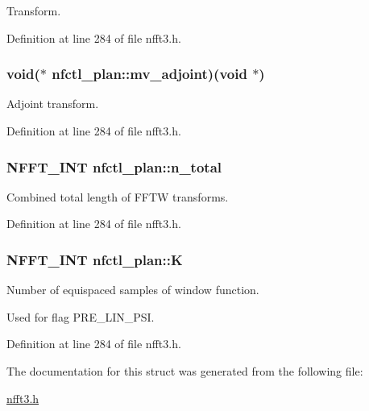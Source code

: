 Transform. 



Definition at line 284 of file nfft3.\-h.

\hypertarget{structnfctl__plan_a99191484b327c3283f3aed8c3e9a3d70}{
\subsubsection[{mv\-\_\-adjoint}]{\setlength{\rightskip}{0pt plus 5cm}void($\ast$ nfctl\-\_\-plan\-::mv\-\_\-adjoint)(void $\ast$)}}\label{structnfctl__plan_a99191484b327c3283f3aed8c3e9a3d70}


Adjoint transform. 



Definition at line 284 of file nfft3.\-h.

\hypertarget{structnfctl__plan_a7c2552cb7e53bc6dddf9fe9c8b8b529a}{
\subsubsection[{n\-\_\-total}]{\setlength{\rightskip}{0pt plus 5cm}N\-F\-F\-T\-\_\-\-I\-N\-T nfctl\-\_\-plan\-::n\-\_\-total}}\label{structnfctl__plan_a7c2552cb7e53bc6dddf9fe9c8b8b529a}


Combined total length of F\-F\-T\-W transforms. 



Definition at line 284 of file nfft3.\-h.

\hypertarget{structnfctl__plan_a0a11ee75ee2bc2f21adf403d0fca7f80}{
\subsubsection[{K}]{\setlength{\rightskip}{0pt plus 5cm}N\-F\-F\-T\-\_\-\-I\-N\-T nfctl\-\_\-plan\-::\-K}}\label{structnfctl__plan_a0a11ee75ee2bc2f21adf403d0fca7f80}


Number of equispaced samples of window function. 

Used for flag P\-R\-E\-\_\-\-L\-I\-N\-\_\-\-P\-S\-I. 

Definition at line 284 of file nfft3.\-h.



The documentation for this struct was generated from the following file\-:\begin{DoxyCompactItemize}
\item 
\hyperlink{nfft3_8h}{nfft3.\-h}\end{DoxyCompactItemize}
